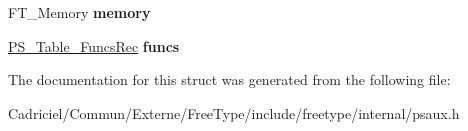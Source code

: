 \begin{DoxyCompactItemize}
\item 
F\+T\+\_\+\+Memory {\bfseries memory}\hypertarget{struct_p_s___table_rec___a061872add9c6d1af67cfdfac5ce2b80d}{}\label{struct_p_s___table_rec___a061872add9c6d1af67cfdfac5ce2b80d}

\item 
\hyperlink{struct_p_s___table___funcs_rec__}{P\+S\+\_\+\+Table\+\_\+\+Funcs\+Rec} {\bfseries funcs}\hypertarget{struct_p_s___table_rec___adced5ad36107c90012e9fafa55eab5b9}{}\label{struct_p_s___table_rec___adced5ad36107c90012e9fafa55eab5b9}

\end{DoxyCompactItemize}


The documentation for this struct was generated from the following file\+:\begin{DoxyCompactItemize}
\item 
Cadriciel/\+Commun/\+Externe/\+Free\+Type/include/freetype/internal/psaux.\+h\end{DoxyCompactItemize}
